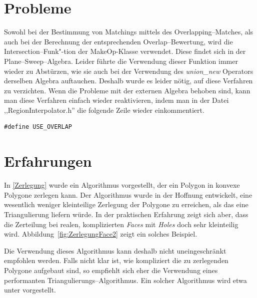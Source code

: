 \section*{Probleme}
Sowohl bei der Bestimmung von Matchings mittels des Overlapping--Matches, als auch bei der Berechnung der entsprechenden Overlap--Bewertung, wird die Intersection--Funk"-tion der MakeOp-Klasse verwendet. Diese findet sich in der Plane--Sweep--Algebra. Leider führte die Verwendung dieser Funktion immer wieder zu Abstürzen, wie sie auch bei der Verwendung des \textit{union\_new} Operators derselben Algebra auftauchen. Deshalb wurde es leider nötig, auf diese Verfahren zu verzichten. Wenn die Probleme mit der externen Algebra behoben sind, kann man diese Verfahren einfach wieder reaktivieren, indem man in der Datei ,,RegionInterpolator.h'' die folgende Zeile wieder einkommentiert.
\begin{verbatim}
#define USE_OVERLAP
\end{verbatim}  

\section*{Erfahrungen}

In \vref{Zerlegung} wurde ein Algorithmus vorgestellt, der ein Polygon in konvexe Polygone zerlegen kann. Der Algorithmus wurde in der Hoffnung entwickelt, eine wesentlich weniger kleinteilige Zerlegung der Polygone zu erreichen, als das eine Triangulierung liefern würde. In der praktischen Erfahrung zeigt sich aber, dass die Zerteilung bei realen, komplizierten \textit{Faces} mit \textit{Holes} doch sehr kleinteilig wird. Abbildung~\vref{fig:ZerlegungFace2} zeigt ein solches Beispiel.

Die Verwendung dieses Algorithmus kann deshalb nicht uneingeschränkt empfohlen werden. Falls nicht klar ist, wie kompliziert die zu zerlegenden Polygone aufgebaut sind, so empfiehlt sich eher die Verwendung eines performanten Triangulierungs--Algorithmus. Ein solcher Algorithmus wird etwa unter \cite{Sei} vorgestellt.



